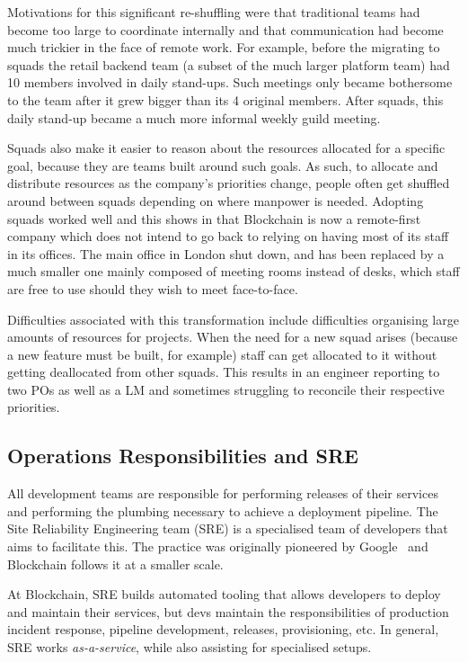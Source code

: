 \documentclass[conference]{IEEEtran}
\begin{document}
    Motivations for this significant re-shuffling were that traditional teams had become too large to coordinate internally and that communication had become much trickier in the face of remote work.
    For example, before the migrating to squads the retail backend team (a subset of the much larger platform team) had 10 members involved in daily stand-ups.
    Such meetings only became bothersome to the team after it grew bigger than its 4 original members.
    After squads, this daily stand-up became a much more informal weekly guild meeting.

    Squads also make it easier to reason about the resources allocated for a specific goal, because they are teams built around such goals.
    As such, to allocate and distribute resources as the company's priorities change, people often get shuffled around between squads depending on where manpower is needed.
    Adopting squads worked well and this shows in that Blockchain is now a remote-first company which does not intend to go back to relying on having most of its staff in its offices.
    The main office in London shut down, and has been replaced by a much smaller one mainly composed of meeting rooms instead of desks, which staff are free to use should they wish to meet face-to-face.

    Difficulties associated with this transformation include difficulties organising large amounts of resources for projects.
    When the need for a new squad arises (because a new feature must be built, for example) staff can get allocated to it without getting deallocated from other squads.
    This results in an engineer reporting to two POs as well as a LM and sometimes struggling to reconcile their respective priorities.

    \subsection{Operations Responsibilities and SRE}

    All development teams are responsible for performing releases of their services and performing the plumbing necessary to achieve a deployment pipeline.
    The Site Reliability Engineering team (SRE) is a specialised team of developers that aims to facilitate this.
    The practice was originally pioneered by Google~\cite{googleSreIntro} and Blockchain follows it at a smaller scale.

    At Blockchain, SRE builds automated tooling that allows developers to deploy and maintain their services, but devs maintain the responsibilities of production incident response, pipeline development, releases, provisioning, etc.
    In general, SRE works \emph{as-a-service}, while also assisting for specialised setups.
\end{document}
